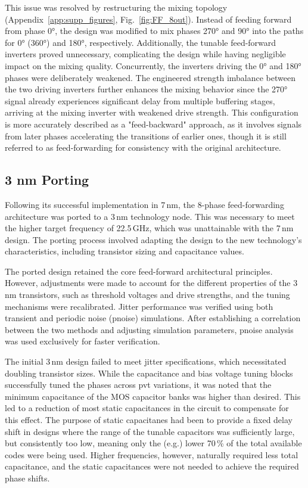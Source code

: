 This issue was resolved by restructuring the mixing topology (Appendix~\ref{app:supp_figures}, Fig.~\ref{fig:FF_8out}). Instead of feeding forward from phase \ang{0}, the design was modified to mix phases \ang{270} and \ang{90} into the paths for \ang{0} (\ang{360}) and \ang{180}, respectively. Additionally, the tunable feed-forward inverters proved unnecessary, complicating the design while having negligible impact on the mixing quality. Concurrently, the inverters driving the \ang{0} and \ang{180} phases were deliberately weakened. The engineered strength imbalance between the two driving inverters further enhances the mixing behavior since the \ang{270} signal already experiences significant delay from multiple buffering stages, arriving at the mixing inverter with weakened drive strength. This configuration is more accurately described as a "feed-backward" approach, as it involves signals from later phases accelerating the transitions of earlier ones, though it is still referred to as feed-forwarding for consistency with the original architecture.


\subsection{3 nm Porting}\label{sec:3nm_porting}

Following its successful implementation in 7\,nm, the 8-phase feed-forwarding architecture was ported to a 3\,nm technology node. This was necessary to meet the higher target frequency of 22.5\,GHz, which was unattainable with the 7\,nm design. The porting process involved adapting the design to the new technology's characteristics, including transistor sizing and capacitance values.

The ported design retained the core feed-forward architectural principles. However, adjustments were made to account for the different properties of the 3 nm transistors, such as threshold voltages and drive strengths, and the tuning mechanisms were recalibrated. Jitter performance was verified using both transient and periodic noise (pnoise) simulations. After establishing a correlation between the two methods and adjusting simulation parameters, pnoise analysis was used exclusively for faster verification.

The initial 3\,nm design failed to meet jitter specifications, which necessitated doubling transistor sizes. While the capacitance and bias voltage tuning blocks successfully tuned the phases across \gls{pvt} variations, it was noted that the minimum capacitance of the MOS capacitor banks was higher than desired. This led to a reduction of most static capacitances in the circuit to compensate for this effect. The purpose of static capacitanes had been to provide a fixed delay shift in designs where the range of the tunable capacitors was sufficiently large, but consistently too low, meaning only the (e.g.) lower 70\,\% of the total available codes were being used. Higher frequencies, however, naturally required less total capacitance, and the static capacitances were not needed to achieve the required phase shifts. 

